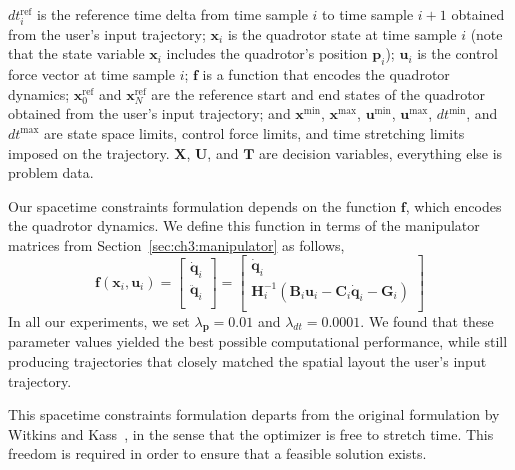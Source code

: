 $dt_i^{\text{ref}}$ is the reference time delta from time sample $i$ to time sample $i+1$ obtained from the user's input trajectory;
$\mathbf{x}_i$ is the quadrotor state at time sample $i$ (note that the state variable $\mathbf{x}_i$ includes the quadrotor's position $\mathbf{p}_i$);
$\mathbf{u}_i$ is the control force vector at time sample $i$;
$\mathbf{f}$ is a function that encodes the quadrotor dynamics;
$\mathbf{x}_0^{\text{ref}}$ and $\mathbf{x}_N^{\text{ref}}$ are the reference start and end states of the quadrotor obtained from the user's input trajectory;
and $\mathbf{x}^{\text{min}}$, $\mathbf{x}^{\text{max}}$, $\mathbf{u}^{\text{min}}$, $\mathbf{u}^{\text{max}}$, $dt^{\text{min}}$, and $dt^{\text{max}}$ are state space limits, control force limits, and time stretching limits imposed on the trajectory.
$\mathbf{X}$, $\mathbf{U}$, and $\mathbf{T}$ are decision variables, everything else is problem data.

Our spacetime constraints formulation depends on the function $\mathbf{f}$, which encodes the quadrotor dynamics.
We define this function in terms of the manipulator matrices from Section~\ref{sec:ch3:manipulator} as follows,
%
\begin{equation}
\mathbf{f}(\mathbf{x}_i,\mathbf{u}_i) =
\begin{bmatrix}
\dot{\mathbf{q}}_i  \\
\ddot{\mathbf{q}}_i \\
\end{bmatrix} =
\begin{bmatrix}
\dot{\mathbf{q}}_i  \\
\mathbf{H}^{-1}_i( \mathbf{B}_i\mathbf{u}_i - \mathbf{C}_i\dot{\mathbf{q}}_i - \mathbf{G}_i) \\
\end{bmatrix}
\end{equation}
%
In all our experiments, we set $\lambda_\mathbf{p} = 0.01$ and $\lambda_{dt} = 0.0001$.
We found that these parameter values yielded the best possible computational performance, while still producing trajectories that closely matched the spatial layout the user's input trajectory.

This spacetime constraints formulation  departs from the original formulation by Witkins and Kass~, in the sense that the optimizer is free to stretch time.
This freedom is required in order to ensure that a feasible solution exists.

